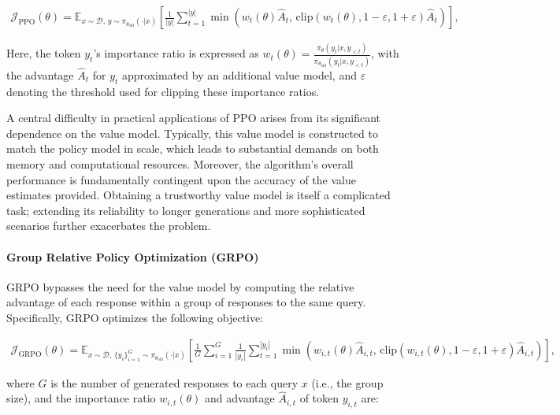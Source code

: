 \begin{align}
\mathcal{J}_\text{PPO}(\theta) = \mathbb{E}_{ x \sim \mathcal{D},\, y \sim \pi_{\theta_\text{old}}( \cdot | x) }
\left[ \frac{1}{|y|} \sum_{t=1}^{|y|} 
\min \left( w_{t}(\theta) \widehat{A}_{t},  \, \mathrm{clip} \left( w_{t}(\theta), 1 - {\varepsilon}, 1 + {\varepsilon}\right) \widehat{A}_{t} \right)
\right],
\end{align}

Here, the token $y_t$'s importance ratio is expressed as $
w_{t}(\theta) = \frac{ \pi_{\theta} (y_{t} | x, y_{<t}) }{ \pi_{\theta_\text{old}} (y_{t} | x,y_{<t})} $, with the advantage $\widehat{A}_{t}$ for $y_t$ approximated by an additional value model, and $\varepsilon$ denoting the threshold used for clipping these importance ratios.

A central difficulty in practical applications of PPO arises from its significant dependence on the value model. Typically, this value model is constructed to match the policy model in scale, which leads to substantial demands on both memory and computational resources. Moreover, the algorithm's overall performance is fundamentally contingent upon the accuracy of the value estimates provided. Obtaining a trustworthy value model is itself a complicated task; extending its reliability to longer generations and more sophisticated scenarios further exacerbates the problem.

\paragraph{Group Relative Policy Optimization (GRPO)} GRPO \citep{grpo} bypasses the need for the value model by computing the relative advantage of each response within a group of responses to the same query. Specifically, GRPO optimizes the following objective:

\begin{align}
\label{equ:grpo}
\mathcal{J}_\text{GRPO}(\theta) = \mathbb{E}_{ x \sim \mathcal{D},\, \{y_i\}_{i=1}^G \sim \pi_{\theta_\text{old}}( \cdot | x) }
\left[ \frac{1}{G} \sum_{i=1}^{G} \frac{1}{|y_i|} \sum_{t=1}^{|y_i|} 
\min \left( w_{i,t}(\theta) \widehat{A}_{i,t},  \, \mathrm{clip} \left( w_{i,t}(\theta), 1 - {\varepsilon}, 1 + {\varepsilon}\right) \widehat{A}_{i,t} \right)
\right],
\end{align}

where $G$ is the number of generated responses to each query $x$ (i.e., the group size), and the importance ratio $w_{i,t}(\theta)$ and advantage $\widehat{A}_{i,t}$ of token $y_{i,t}$ are:

